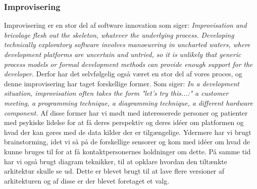 \subsubsection{Improvisering}
Improvisering er en stor del af software innovation som \citet[side 56]{book:softwareinnovation} siger: \textit{Improvisation and bricolage flesh out the skeleton, whatever the underlying process. Developing technically exploratory software involves manoeuvring in uncharted waters, where development platforms are uncertain and untried, so it is unlikely that generic process models or formal development methods can provide enough support for the developer.}
Derfor har det selvfølgelig også været en stor del af vores proces, og denne improvisering har taget forskellige former.
Som \citet[side 56]{book:softwareinnovation} siger: \textit{In a development situation, improvisation often takes the form "let's try this...:" a customer meeting, a programming technique, a diagramming technique, a different hardware component.}
Af disse former har vi mødt med interesserede personer og patienter med psykiske lidelse for at få deres perspektiv og deres idéer om platformen og hvad der kan gøres med de data kilder der er tilgængelige. 
Ydermere har vi brugt brainstorming, idet vi så på de forskellige sensorer og kom med idéer om hvad de kunne bruges til for at få kontaktpersonernes holdninger om dette.
På samme tid har vi også brugt diagram teknikker, til at opklare hvordan den tiltænkte arkitektur skulle se ud.
Dette er blevet brugt til at lave flere versioner af arkitekturen og af disse er der blevet foretaget et valg.
